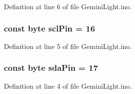 Definition at line 6 of file Gemini\-Light.\-ino.

\hypertarget{_gemini_light_8ino_a22f7ca6ca71734a01a826f4abd36e13e}{
\subsubsection[{scl\-Pin}]{\setlength{\rightskip}{0pt plus 5cm}const byte scl\-Pin = 16}}\label{_gemini_light_8ino_a22f7ca6ca71734a01a826f4abd36e13e}


Definition at line 5 of file Gemini\-Light.\-ino.

\hypertarget{_gemini_light_8ino_afa6793708eee64e6f0f328cbc61b5b22}{
\subsubsection[{sda\-Pin}]{\setlength{\rightskip}{0pt plus 5cm}const byte sda\-Pin = 17}}\label{_gemini_light_8ino_afa6793708eee64e6f0f328cbc61b5b22}


Definition at line 4 of file Gemini\-Light.\-ino.

